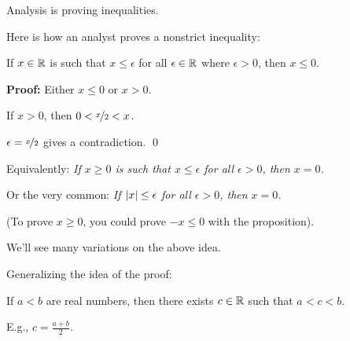 \documentclass[10pt,aspectratio=149]{beamer}
\begin{document}
\begin{frame}
Analysis is proving inequalities.  

\pause

Here is how an analyst proves a nonstrict inequality:

\begin{proposition}
If $x \in {\mathbb{R}}$ is such that $x \leq \epsilon$ for all
$\epsilon \in {\mathbb{R}}$ where
$\epsilon > 0$, \pause then $x \leq 0$.
\end{proposition}

\pause

\textbf{Proof:}
Either $x \leq 0$ or $x > 0$.

\pause
If $x > 0$, then $0 < \nicefrac{x}{2} < x$.

\pause
$\epsilon = \nicefrac{x}{2}$ gives a contradiction.
\qed

\medskip
\pause

Equivalently:
\quad
\emph{If $x \geq 0$ is such that $x \leq \epsilon$ for all
$\epsilon > 0$, then $x = 0$.}

\medskip
\pause

Or the very common:
\quad
\emph{If $\left\lvert {x} \right\rvert \leq \epsilon$ for all
$\epsilon > 0$, then $x = 0$.}

\medskip
\pause

(To prove $x \geq 0$, you could prove $-x \leq 0$ with the proposition).

\medskip
\pause

We'll see many variations on the above idea.

\medskip
\pause

Generalizing the idea of the proof:

\pause

If $a < b$ are real numbers, then there
exists $c \in {\mathbb{R}}$ such that $a < c < b$.

\pause
E.g., 
$c = \frac{a+b}{2}$.
\end{frame}
\end{document}
